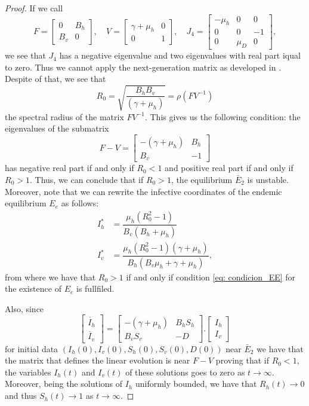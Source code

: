 \documentclass{amsart}
\theoremstyle{definition}
\theoremstyle{remark}
\numberwithin{equation}{section}
\begin{document}
\begin{proof}
 If we call 
\[
F=\begin{bmatrix}
	0 & B_h \\
	B_v& 0
\end{bmatrix}, \quad 
V=\begin{bmatrix}
	\gamma+\mu_h &0 \\
 0& 1
\end{bmatrix}, \quad 
J_4=\begin{bmatrix}
-\mu_h & 0 &0\\
0& 0& - 1\\
0 &  \mu_D & 0
\end{bmatrix},
\]
we see that $J_4$ has a negative eigenvalue and two eigenvalues with real part iqual to zero.
Thus we cannot apply the next-generation matrix as 
developed in \cite{Driessche2002}. Despite of that, we see that
\begin{equation*}
R_0=\sqrt{\frac{B_h B_v }{ (\gamma + \mu_h)  }}=\rho(FV^{-1})
\end{equation*}
the spectral radius of the matrix $FV^{-1}$. This gives us the following condition:
the eigenvalues of the submatrix
$$F-V = \begin{bmatrix}
-(\gamma + \mu_h) &B_h\\%
B_v & -1 
\end{bmatrix} $$
has negative real part if and only if
$R_0 < 1$ and positive real part if and only if $R_0>1$. Thus, we can conclude that if $R_0>1$, the equilibrium $\bar{E}_2$ is unstable. Moreover, note that we can rewrite the infective coordinates of the endemic equilibrium $E_e$ as follows:
\begin{align*}
I_h^* &= \dfrac{\mu_h (R_0^2-1)}{B_v (B_h + \mu_h)} \\
I_v^* &= \dfrac{\mu_h (R_0^2-1)(\gamma + \mu_h)}{B_h (B_v \mu_h + \gamma + \mu_h)},
\end{align*}
from where we have that $R_0>1$ if and only if condition \eqref{eq: condicion_EE} for the existence of $E_e$ is fullfiled. 


Also, since 
\begin{equation}\label{matriz infec}
	\begin{bmatrix} 
\dot{I_h} \\ \dot{I_v} \end{bmatrix} = 
\begin{bmatrix}
-(\gamma + \mu_h) & B_h S_h\\%
B_v S_v & -D
\end{bmatrix}. \begin{bmatrix} 
{I_h} \\ {I_v} \end{bmatrix}
\end{equation}
for initial data $(I_h(0),I_v(0),S_h(0),S_v(0),D(0))$ near $\bar{E}_2$ we have that the matrix that defines the linear evolution is near $F-V$ proving that if $R_0<1$, the variables $I_h(t)$ and $I_v(t)$ of these solutions goes to zero as $t\to \infty$. Moreover, being the solutions of $I_h$ uniformly bounded, we have that $R_h(t) \to 0$ and thus $S_h(t)\to 1$ as $t\to \infty$.
\end{proof}
\end{document}
